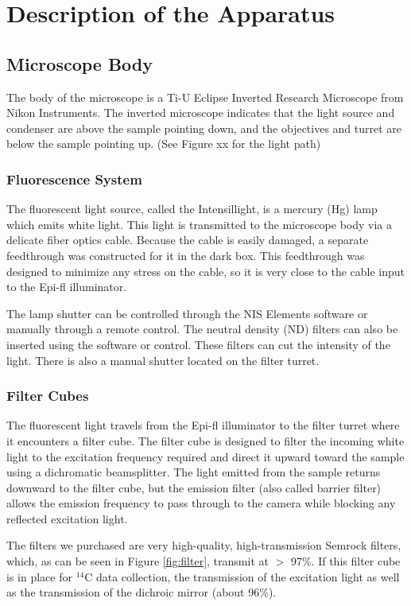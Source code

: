 \documentclass[11pt]{amsart}
\begin{document}
\section{Description of the Apparatus}
\subsection{Microscope Body}
The body of the microscope is a Ti-U Eclipse Inverted Research Microscope from Nikon Instruments.  The inverted microscope indicates that the light source and condenser are above the sample pointing down, and the objectives and turret are below the sample pointing up.  (See Figure xx for the light path)

\subsubsection{Fluorescence System}
The fluorescent light source, called the Intensillight, is a mercury (Hg) lamp which emits white light.  This light is transmitted to the microscope body via a delicate fiber optics cable.  Because the cable is easily damaged, a separate feedthrough was constructed for it in the dark box.  This feedthrough was designed to minimize any stress on the cable, so it is very close to the cable input to the Epi-fl illuminator.  

The lamp shutter can be controlled through the NIS Elements software or manually through a remote control.  The neutral density (ND) filters can also be inserted using the software or control.  These filters can cut the intensity of the light.  There is also a manual shutter located on the filter turret.

\subsubsection{Filter Cubes}
The fluorescent light travels from the Epi-fl illuminator to the filter turret where it encounters a filter cube.  The filter cube is designed to filter the incoming white light to the excitation frequency required and direct it upward toward the sample using a dichromatic beamsplitter.  The light emitted from the sample returns downward to the filter cube, but the emission filter (also called barrier filter) allows the emission frequency to pass through to the camera while blocking any reflected excitation light.  

The filters we purchased are very high-quality, high-transmission Semrock filters, which, as can be seen in Figure \ref{fig:filter}, transmit at $>$ 97\%.  If this filter cube is in place for $^{14}$C data collection, the transmission of the excitation light as well as the transmission of the dichroic mirror (about 96\%).  
\end{document}
